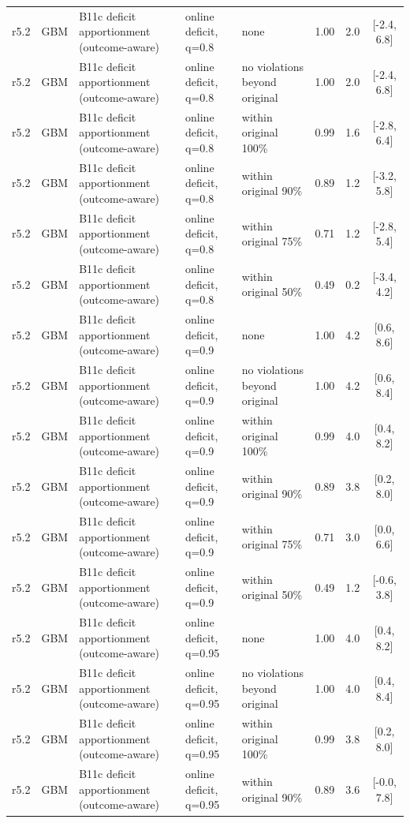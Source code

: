 \documentclass[10pt,onecolumn,letterpaper]{article}
\begin{document}
\begin{longtable}{lllp{4.2cm}p{3.4cm}ccc}
r5.2 & GBM & B11c deficit apportionment (outcome-aware) & online deficit, q=0.8 & none & 1.00 & 2.0 & [-2.4, 6.8] \\
r5.2 & GBM & B11c deficit apportionment (outcome-aware) & online deficit, q=0.8 & no violations beyond original & 1.00 & 2.0 & [-2.4, 6.8] \\
r5.2 & GBM & B11c deficit apportionment (outcome-aware) & online deficit, q=0.8 & within original 100\% & 0.99 & 1.6 & [-2.8, 6.4] \\
r5.2 & GBM & B11c deficit apportionment (outcome-aware) & online deficit, q=0.8 & within original 90\% & 0.89 & 1.2 & [-3.2, 5.8] \\
r5.2 & GBM & B11c deficit apportionment (outcome-aware) & online deficit, q=0.8 & within original 75\% & 0.71 & 1.2 & [-2.8, 5.4] \\
r5.2 & GBM & B11c deficit apportionment (outcome-aware) & online deficit, q=0.8 & within original 50\% & 0.49 & 0.2 & [-3.4, 4.2] \\
r5.2 & GBM & B11c deficit apportionment (outcome-aware) & online deficit, q=0.9 & none & 1.00 & 4.2 & [0.6, 8.6] \\
r5.2 & GBM & B11c deficit apportionment (outcome-aware) & online deficit, q=0.9 & no violations beyond original & 1.00 & 4.2 & [0.6, 8.4] \\
r5.2 & GBM & B11c deficit apportionment (outcome-aware) & online deficit, q=0.9 & within original 100\% & 0.99 & 4.0 & [0.4, 8.2] \\
r5.2 & GBM & B11c deficit apportionment (outcome-aware) & online deficit, q=0.9 & within original 90\% & 0.89 & 3.8 & [0.2, 8.0] \\
r5.2 & GBM & B11c deficit apportionment (outcome-aware) & online deficit, q=0.9 & within original 75\% & 0.71 & 3.0 & [0.0, 6.6] \\
r5.2 & GBM & B11c deficit apportionment (outcome-aware) & online deficit, q=0.9 & within original 50\% & 0.49 & 1.2 & [-0.6, 3.8] \\
r5.2 & GBM & B11c deficit apportionment (outcome-aware) & online deficit, q=0.95 & none & 1.00 & 4.0 & [0.4, 8.2] \\
r5.2 & GBM & B11c deficit apportionment (outcome-aware) & online deficit, q=0.95 & no violations beyond original & 1.00 & 4.0 & [0.4, 8.4] \\
r5.2 & GBM & B11c deficit apportionment (outcome-aware) & online deficit, q=0.95 & within original 100\% & 0.99 & 3.8 & [0.2, 8.0] \\
r5.2 & GBM & B11c deficit apportionment (outcome-aware) & online deficit, q=0.95 & within original 90\% & 0.89 & 3.6 & [-0.0, 7.8] \\

\end{longtable}
\end{document}
